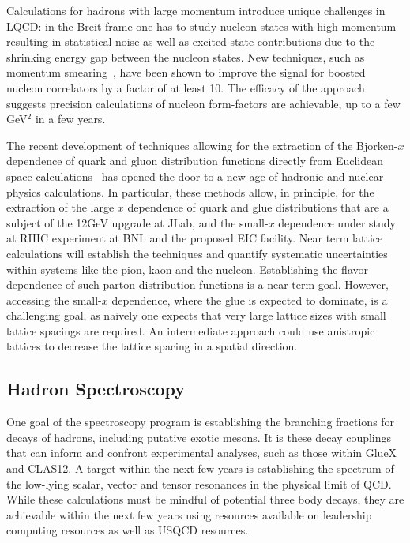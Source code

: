 Calculations for hadrons with large momentum introduce unique challenges in LQCD: in the Breit frame one 
has to study nucleon states with high momentum 
resulting in statistical noise as well as excited state contributions due to the
shrinking energy gap between the nucleon states.
New techniques, such as momentum smearing~\cite{Bali:2016lva,Syritsyn:2017jrc}, have been shown to improve
the signal for boosted nucleon correlators by a factor of at least 10. The efficacy of the approach suggests precision calculations of nucleon form-factors are achievable, up to a few GeV$^2$ in a few years.


The recent development of techniques allowing for the extraction of the Bjorken-$x$ dependence of quark and gluon distribution functions directly from Euclidean space calculations~\cite{Ji:2001wha} has opened the door to a new age of hadronic and nuclear physics calculations. In particular, these methods allow, in principle, for the extraction of the large $x$ dependence of quark and glue distributions that are a subject of the 12GeV upgrade at JLab, and the small-$x$ dependence under study at RHIC experiment at BNL and the proposed EIC facility. Near term  lattice calculations will establish the techniques and quantify systematic uncertainties within systems like the pion, kaon and the nucleon. Establishing the flavor dependence of such parton distribution functions is a near term goal. However, accessing the small-$x$ dependence, where the glue is expected to dominate, is a challenging goal, as naively one expects that very large lattice sizes with small lattice spacings are required. An intermediate approach could use anistropic lattices to decrease the lattice spacing in a spatial direction.%



\subsection{Hadron Spectroscopy}

One goal of the spectroscopy program is establishing the branching fractions for decays of hadrons, including putative exotic mesons. It is these decay couplings that can inform and confront experimental analyses, such as those within GlueX and CLAS12. A target within the next few years is establishing the spectrum of the low-lying scalar, vector and tensor resonances in the physical limit of QCD. While these calculations must be mindful of potential three body decays, they are achievable within the next few years using resources available on leadership computing resources as well as USQCD resources.


